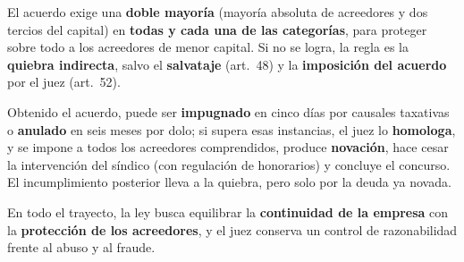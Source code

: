 \documentclass[12pt,oneside]{book}
\begin{document}
El acuerdo exige una \textbf{doble mayoría} (mayoría absoluta de acreedores y dos tercios del capital) en \textbf{todas y cada una de las categorías}, para proteger sobre todo a los acreedores de menor capital. Si no se logra, la regla es la \textbf{quiebra indirecta}, salvo el \textbf{salvataje} (art.\ 48) y la \textbf{imposición del acuerdo} por el juez (art.\ 52).

Obtenido el acuerdo, puede ser \textbf{impugnado} en cinco días por causales taxativas o \textbf{anulado} en seis meses por dolo; si supera esas instancias, el juez lo \textbf{homologa}, y se impone a todos los acreedores comprendidos, produce \textbf{novación}, hace cesar la intervención del síndico (con regulación de honorarios) y concluye el concurso. El incumplimiento posterior lleva a la quiebra, pero solo por la deuda ya novada.

En todo el trayecto, la ley busca equilibrar la \textbf{continuidad de la empresa} con la \textbf{protección de los acreedores}, y el juez conserva un control de razonabilidad frente al abuso y al fraude.
\end{document}
